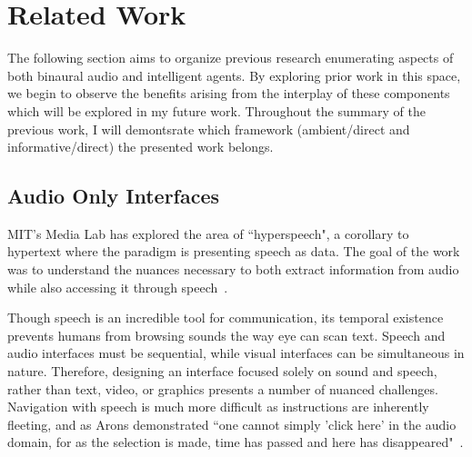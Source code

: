 \newpage                                                \chapter{Related Work}

The following section aims to organize previous research enumerating aspects
of both binaural audio and intelligent agents. By exploring prior work in this
space, we begin to observe the benefits arising from the interplay of these
components which will be explored in my future work. Throughout the summary of 
the previous work, I will demontsrate which framework (ambient/direct and 
informative/direct) the presented work belongs.



\section{                  Audio Only Interfaces                             }

MIT's Media Lab has explored the area of ``hyperspeech", a corollary to
hypertext where the paradigm is presenting speech as data.  The goal of the
work was to understand the nuances necessary to both extract information from
audio while also accessing it through speech~\cite{arons1991hyperspeech}.

Though speech is an incredible tool for communication, its temporal existence
prevents humans from browsing sounds the way eye can scan text.  Speech and
audio interfaces must be sequential, while visual interfaces can be
simultaneous in nature.  Therefore, designing an interface focused solely on
sound and speech, rather than text, video, or graphics presents a number of
nuanced challenges.  Navigation with speech is much more difficult as
instructions are inherently fleeting, and as Arons demonstrated ``one cannot simply
'click here' in the audio domain, for as the selection is made, time has passed
and here has  disappeared"~\cite{arons1991hyperspeech}.

